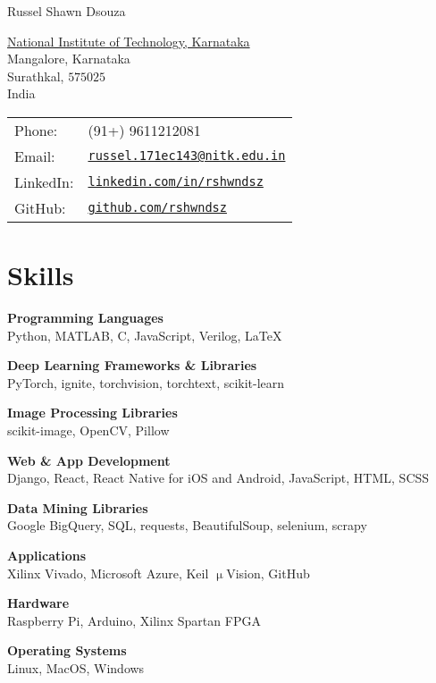 \documentclass[letterpaper]{article}
\def\name{Russel Shawn Dsouza}
\renewenvironment{itemize}{
  \begin{list}{}{
    \setlength{\leftmargin}{1.5em}
  }
}{
  \end{list}
}
\begin{document}
{\huge \name}


\vspace{0.25in}

\begin{minipage}{0.45\linewidth}
  \href{http://www.nitk.ac.in/}{National Institute of Technology, Karnataka} \\
  Mangalore, Karnataka \\
  Surathkal, $575025$\\
  India
\end{minipage}
\hfill
\begin{minipage}{0.45\linewidth}
  \begin{tabular}{ll}
    Phone: & (91+) 9611212081 \\
    Email: & \href{mailto:russel.171ec143@nitk.edu.in}{\tt russel.171ec143@nitk.edu.in} \\
    LinkedIn: & \href{https://www.linkedin.com/in/rshwndsz}{\tt linkedin.com/in/rshwndsz} \\
    GitHub: & \href{https://www.github.com/rshwndsz}{\tt github.com/rshwndsz}
  \end{tabular}
\end{minipage}

\section*{Skills}
  \begin{itemize}
    \item \textbf{Programming Languages}\\ 
    Python, MATLAB, C, JavaScript, Verilog, \LaTeX
    \item \textbf{Deep Learning Frameworks \& Libraries}\\ 
    PyTorch, ignite, torchvision, torchtext, scikit-learn
    \item \textbf{Image Processing Libraries}\\
    scikit-image, OpenCV, Pillow
    \item \textbf{Web \& App Development}\\
    Django, React, React Native for iOS and Android, JavaScript, HTML, SCSS
    \item \textbf{Data Mining Libraries}\\
    Google BigQuery, SQL, requests, BeautifulSoup, selenium, scrapy
    \item \textbf{Applications}\\
    Xilinx Vivado, Microsoft Azure, Keil $\upmu$Vision, GitHub
    \item \textbf{Hardware}\\
    Raspberry Pi, Arduino, Xilinx Spartan FPGA
    \item \textbf{Operating Systems}\\
    Linux, MacOS, Windows
  \end{itemize}
\end{document}
